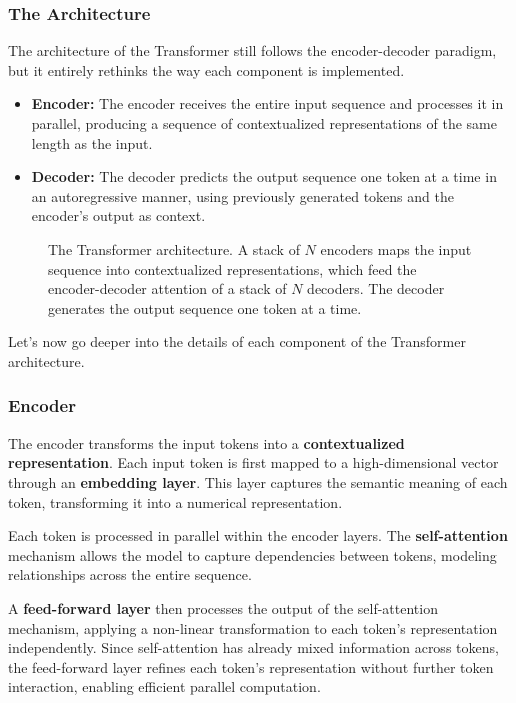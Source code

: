 \subsubsection{The Architecture}
The architecture of the Transformer still follows the encoder-decoder paradigm, but it entirely rethinks the way each component is implemented.

\begin{itemize}
    \item \textbf{Encoder:} The encoder receives the entire input sequence and processes it in parallel, producing a sequence of contextualized representations of the same length as the input.
    \item \textbf{Decoder:} The decoder predicts the output sequence one token at a time in an autoregressive manner, using previously generated tokens and the encoder's output as context.
\end{itemize}

\begin{figure}[H]
    \centering
    \resizebox{0.85\textwidth}{!}{}
    \caption{The Transformer architecture. A stack of $N$ encoders maps the input sequence into contextualized representations, which feed the encoder-decoder attention of a stack of $N$ decoders. The decoder generates the output sequence one token at a time.}
\end{figure}

Let's now go deeper into the details of each component of the Transformer architecture.

\subsubsection{Encoder}
The encoder transforms the input tokens into a \textbf{contextualized representation}. 
Each input token is first mapped to a high-dimensional vector through an \textbf{embedding layer}. This layer captures the semantic meaning of each token, transforming it into a numerical representation.

Each token is processed in parallel within the encoder layers. The \textbf{self-attention} mechanism allows the model to capture dependencies between tokens, modeling relationships across the entire sequence.

A \textbf{feed-forward layer} then processes the output of the self-attention mechanism, applying a non-linear transformation to each token's representation independently.
Since self-attention has already mixed information across tokens, the feed-forward layer refines each token's representation without further token interaction, enabling efficient parallel computation.

